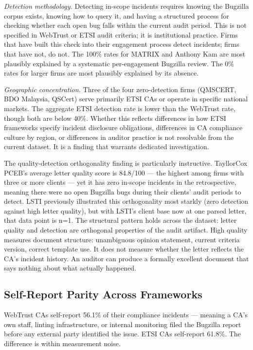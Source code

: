 \documentclass[10pt,twocolumn,letterpaper]{article}
\begin{document}
\textit{Detection methodology.} Detecting in-scope incidents requires
knowing the Bugzilla corpus exists, knowing how to query it, and having
a structured process for checking whether each open bug falls within
the current audit period. This is not specified in WebTrust or ETSI
audit criteria; it is institutional practice. Firms that have built
this check into their engagement process detect incidents; firms that
have not, do not. The 100\% rates for MATRIX and Anthony Kam are most
plausibly explained by a systematic per-engagement Bugzilla review.
The 0\% rates for larger firms are most plausibly explained by its
absence.

\textit{Geographic concentration.} Three of the four zero-detection
firms (QMSCERT, BDO Malaysia, QSCert) serve
primarily ETSI CAs or operate in specific national markets. The
aggregate ETSI detection rate is lower than the WebTrust rate, though
both are below 40\%. Whether this reflects differences in how ETSI
frameworks specify incident disclosure obligations, differences in CA
compliance culture by region, or differences in auditor practice is
not resolvable from the current dataset. It is a finding that warrants
dedicated investigation.

The quality-detection orthogonality finding is particularly instructive.
TayllorCox PCEB's average letter quality score is 84.8/100 --- the highest
among firms with three or more clients --- yet it has zero in-scope
incidents in the retrospective, meaning there were no open Bugzilla bugs
during their clients' audit periods to detect.
LSTI previously illustrated this orthogonality most starkly (zero detection
against high letter quality), but with LSTI's client base now at one parsed letter,
that data point is n=1. The structural pattern holds across the dataset:
letter quality and detection are orthogonal properties of the audit
artifact. High quality measures document structure: unambiguous opinion
statement, current criteria version, correct template use. It does not
measure whether the letter reflects the CA's incident history. An
auditor can produce a formally excellent document that says nothing
about what actually happened.

\subsection{Self-Report Parity Across Frameworks}
\label{sec:selfreport}

WebTrust CAs self-report 56.1\% of their compliance incidents ---
meaning a CA's own staff, linting infrastructure, or internal monitoring
filed the Bugzilla report before any external party identified the
issue. ETSI CAs self-report 61.8\%. The difference is within
measurement noise.
\end{document}
